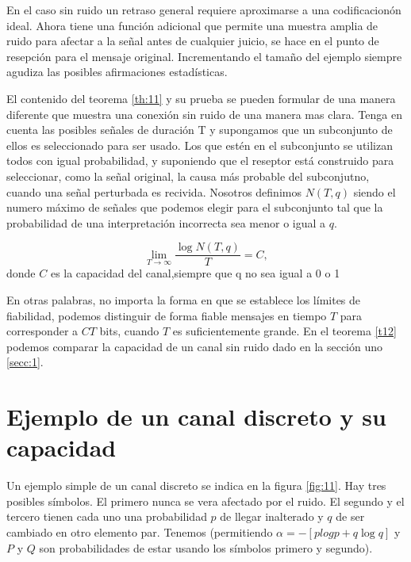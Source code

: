 En el caso sin ruido un retraso general requiere aproximarse a una codificacion\'on ideal. Ahora tiene una 
funci\'on adicional que permite una muestra amplia de ruido para afectar a la se\~{n}al antes de cualquier juicio, se hace 
en el punto de resepci\'on para el mensaje original. Incrementando el tama\~{n}o del ejemplo siempre agudiza las
posibles afirmaciones estad\'isticas.

El contenido del teorema \ref{th:11} y su prueba se pueden formular de una manera diferente que muestra 
una conexi\'on sin ruido de una manera mas clara. Tenga en cuenta las posibles se\~{n}ales de duraci\'on T y supongamos 
que un subconjunto de ellos es seleccionado para ser usado. Los que est\'en en el subconjunto se utilizan todos con igual probabilidad, y suponiendo 
que el reseptor est\'a construido para seleccionar, como la se\~{n}al original, la causa m\'as probable del subconjutno, cuando 
una se\~{n}al perturbada es recivida. Nosotros definimos $N(T,q)$ siendo el numero m\'aximo de se\~{n}ales que podemos elegir 
para el subconjunto tal que la probabilidad de una interpretaci\'{o}n incorrecta sea menor o igual a $q$.

\begin{theorem}
\label{th:12}
  \begin{equation} \lim_{T \to{} \infty}\frac{\log{N}(T,q)}{T} =
    C, \end{equation} donde $C$ es la capacidad del canal,siempre
    que q no sea igual a 0 o 1
\end{theorem}

En otras palabras, no importa la forma en que se establece los l\'imites de fiabilidad, podemos distinguir de forma fiable mensajes 
en tiempo $T$ para corresponder a $CT$ bits, cuando $T$ es suficientemente grande. 
En el teorema \ref{t12} podemos comparar la capacidad de un canal sin ruido dado en la secci\'on uno \ref{secc:1}.

\clearpage

\chapter{Ejemplo de un canal discreto y su capacidad}
\label{sec:15}

Un ejemplo simple de un canal discreto se indica en la figura \ref{fig:11}. Hay tres posibles s\'imbolos. El primero nunca se
vera afectado por el ruido. El segundo y el tercero tienen cada uno una probabilidad $p$ de llegar inalterado y 
$q$ de ser cambiado en otro elemento par. Tenemos (permitiendo $\alpha = -[plogp + q\log{q}]$ y $P$ y $Q$ son 
probabilidades de estar usando los s\'imbolos primero y segundo).

